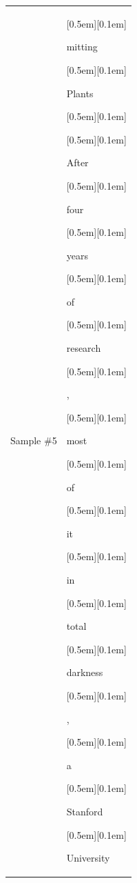 \begin{table}[ht]
\begin{tabular}{@{}l p{13cm}@{}}
\vspace{10pt}
Sample \#5 &
{\setlength{\fboxsep}{1pt}\raisebox{0pt}[0.5em][0.1em]{\colorbox{Salmon!60}{\strut{mitting}}}}{\setlength{\fboxsep}{1pt}\raisebox{0pt}[0.5em][0.1em]{\colorbox{DarkOrchid!25}{\strut{ Plants}}}}{\setlength{\fboxsep}{1pt}\raisebox{0pt}[0.5em][0.1em]{\colorbox{DarkOrchid!25}{\strut{ }}}}{\setlength{\fboxsep}{1pt}\raisebox{0pt}[0.5em][0.1em]{\colorbox{DarkOrchid!25}{\strut{After}}}}{\setlength{\fboxsep}{1pt}\raisebox{0pt}[0.5em][0.1em]{\colorbox{DarkOrchid!25}{\strut{ four}}}}{\setlength{\fboxsep}{1pt}\raisebox{0pt}[0.5em][0.1em]{\colorbox{DarkOrchid!25}{\strut{ years}}}}{\setlength{\fboxsep}{1pt}\raisebox{0pt}[0.5em][0.1em]{\colorbox{DarkOrchid!25}{\strut{ of}}}}{\setlength{\fboxsep}{1pt}\raisebox{0pt}[0.5em][0.1em]{\colorbox{DarkOrchid!25}{\strut{ research}}}}{\setlength{\fboxsep}{1pt}\raisebox{0pt}[0.5em][0.1em]{\colorbox{DarkOrchid!25}{\strut{,}}}}{\setlength{\fboxsep}{1pt}\raisebox{0pt}[0.5em][0.1em]{\colorbox{Salmon!60}{\strut{ most}}}}{\setlength{\fboxsep}{1pt}\raisebox{0pt}[0.5em][0.1em]{\colorbox{DarkOrchid!25}{\strut{ of}}}}{\setlength{\fboxsep}{1pt}\raisebox{0pt}[0.5em][0.1em]{\colorbox{Salmon!60}{\strut{ it}}}}{\setlength{\fboxsep}{1pt}\raisebox{0pt}[0.5em][0.1em]{\colorbox{SkyBlue!55}{\strut{ in}}}}{\setlength{\fboxsep}{1pt}\raisebox{0pt}[0.5em][0.1em]{\colorbox{Salmon!60}{\strut{ total}}}}{\setlength{\fboxsep}{1pt}\raisebox{0pt}[0.5em][0.1em]{\colorbox{DarkOrchid!25}{\strut{ darkness}}}}{\setlength{\fboxsep}{1pt}\raisebox{0pt}[0.5em][0.1em]{\colorbox{SkyBlue!55}{\strut{,}}}}{\setlength{\fboxsep}{1pt}\raisebox{0pt}[0.5em][0.1em]{\colorbox{SkyBlue!55}{\strut{ a}}}}{\setlength{\fboxsep}{1pt}\raisebox{0pt}[0.5em][0.1em]{\colorbox{Salmon!60}{\strut{ Stanford}}}}{\setlength{\fboxsep}{1pt}\raisebox{0pt}[0.5em][0.1em]{\colorbox{Salmon!60}{\strut{ University}}}}


\end{tabular}
\end{table}
